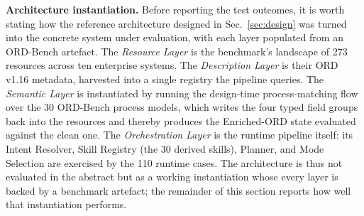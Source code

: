 \documentclass[10pt,twocolumn]{article}
\begin{document}
\textbf{Architecture instantiation.} Before reporting the test outcomes, it is worth stating how the reference architecture designed in Sec.~\ref{sec:design} was turned into the concrete system under evaluation, with each layer populated from an ORD-Bench artefact. The \emph{Resource Layer} is the benchmark's landscape of 273 resources across ten enterprise systems. The \emph{Description Layer} is their ORD v1.16 metadata, harvested into a single registry the pipeline queries. The \emph{Semantic Layer} is instantiated by running the design-time process-matching flow over the 30 ORD-Bench process models, which writes the four typed field groups back into the resources and thereby produces the Enriched-ORD state evaluated against the clean one. The \emph{Orchestration Layer} is the runtime pipeline itself: its Intent Resolver, Skill Registry (the 30 derived skills), Planner, and Mode Selection are exercised by the 110 runtime cases. The architecture is thus not evaluated in the abstract but as a working instantiation whose every layer is backed by a benchmark artefact; the remainder of this section reports how well that instantiation performs.
\end{document}
